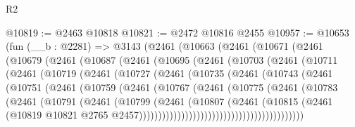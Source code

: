 \begin{lexlean}{R2}
\begin{coremodule}
@10819 := @2463 @10818
@10821 := @2472 @10816 @2455
@10957 := @10653
    (fun (__b : @2281) =>
    @3143
      (@2461
        (@10663
          (@2461
            (@10671
              (@2461
                (@10679
                  (@2461
                    (@10687
                      (@2461
                        (@10695
                          (@2461
                            (@10703
                              (@2461
                                (@10711
                                  (@2461
                                    (@10719
                                      (@2461
                                        (@10727
                                          (@2461
                                            (@10735
                                              (@2461
                                                (@10743
                                                  (@2461
                                                    (@10751
                                                      (@2461
                                                        (@10759
                                                          (@2461
                                                            (@10767
                                                              (@2461
                                                                (@10775
                                                                  (@2461
                                                                    (@10783
                                                                      (@2461
                                                                        (@10791
                                                                          (@2461
                                                                            (@10799
                                                                              (@2461
                                                                                (@10807
                                                                                  (@2461
                                                                                    (@10815
                                                                                      (@2461
                                                                                        (@10819
                                                                                          @10821
                                                                                          @2765
                                                                                          @2457)))))))))))))))))))))))))))))))))))))))))))

\end{coremodule}
\end{lexlean}
